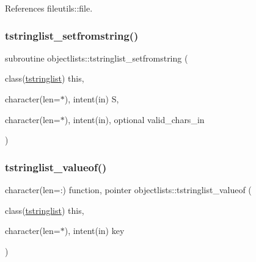 References fileutils\+::file.

\mbox{\label{namespaceobjectlists_a2c19308a10df8614e054244fe735e6d1}} 
\subsubsection{\texorpdfstring{tstringlist\+\_\+setfromstring()}{tstringlist\_setfromstring()}}
{\footnotesize\ttfamily subroutine objectlists\+::tstringlist\+\_\+setfromstring (\begin{DoxyParamCaption}\item[{class(\mbox{\hyperlink{structobjectlists_1_1tstringlist}{tstringlist}})}]{this,  }\item[{character(len=$\ast$), intent(in)}]{S,  }\item[{character(len=$\ast$), intent(in), optional}]{valid\+\_\+chars\+\_\+in }\end{DoxyParamCaption})\hspace{0.3cm}{\ttfamily [private]}}

\mbox{\label{namespaceobjectlists_a8003d8e93e59241bcea25f30d0b95b5a}} 
\subsubsection{\texorpdfstring{tstringlist\+\_\+valueof()}{tstringlist\_valueof()}}
{\footnotesize\ttfamily character(len=\+:) function, pointer objectlists\+::tstringlist\+\_\+valueof (\begin{DoxyParamCaption}\item[{class(\mbox{\hyperlink{structobjectlists_1_1tstringlist}{tstringlist}})}]{this,  }\item[{character(len=$\ast$), intent(in)}]{key }\end{DoxyParamCaption})\hspace{0.3cm}{\ttfamily [private]}}

\mbox{\label{namespaceobjectlists_a1735569cf51270522157e13dfdcedcc3}} 
